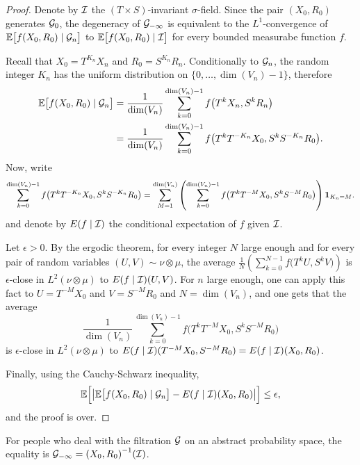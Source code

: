 \documentclass[12pt,a4paper]{article}
\begin{document}
\begin{proof}
Denote by $\mathcal{I}$ the $(T\times S)$-invariant $\sigma$-field. 
Since the pair $(X_0, R_0)$ generates $\mathcal{G}_0$, the degeneracy of $\mathcal{G}_{-\infty}$ 
is equivalent to the $L^1$-convergence of 
$\mathbb{E}\bigl[f(X_0, R_0) \mid \mathcal{G}_n\bigr]$ to $\mathbb{E}\bigl[f(X_0, R_0) \mid \mathcal{I}\bigr]$   
for every bounded measurabe function $f$. 

Recall that $X_{0} = T^{K_n}X_n$ and $R_{0} = S^{K_n}R_n$. 
Conditionally to $\mathcal{G}_n$, the random integer $K_n$ 
has the uniform distribution on $\bigl\{0, \ldots, \dim(V_n)-1\bigr\}$, 
therefore 
\begin{align*}
\mathbb{E}\bigl[f(X_0, R_0) \mid \mathcal{G}_n\bigr]
& =\frac{1}{\dim(V_n)}\sum_{k=0}^{\dim(V_n)-1} f\bigl(T^kX_n, S^kR_n \bigr) \\
& = \frac{1}{\dim(V_n)}\sum_{k=0}^{\dim(V_n)-1} f\bigl(T^{k}T^{-K_n}X_0, S^{k}S^{-K_n}R_0 \bigr).
\end{align*}
Now, write 
$$
\sum_{k=0}^{\dim(V_n)-1} f\bigl(T^{k}T^{-K_n}X_0, S^{k}S^{-K_n}R_0 \bigr) = 
\sum_{M=1}^{\dim(V_n)} \left(\sum_{k=0}^{\dim(V_n)-1} f\bigl(T^kT^{-M}X_0, S^kS^{-M}R_0 \bigr) \right)\boldsymbol 1_{K_n=M}.
$$
and denote by $E(f\mid\mathcal{I})$ the conditional expectation of $f$ given $\mathcal{I}$.

Let $\epsilon>0$. By the ergodic theorem, for every integer $N$ large enough and 
for every pair of random variables $(U,V) \sim \nu \otimes \mu$, the average 
$\frac{1}{N} \left(\sum_{k=0}^{N-1} f\bigl(T^k U, S^kV\bigr) \right)$ 
is $\epsilon$-close in $L^2(\nu \otimes \mu)$ to 
$E(f\mid\mathcal{I})(U,V)$. 
For $n$ large enough, one can apply this fact to $U=T^{-M}X_0$ and $V=S^{-M}R_0$ and 
$N=\dim(V_n)$, and one gets that the average 
$$
\frac{1}{\dim(V_n)}\sum_{k=0}^{\dim(V_n)-1} f\bigl(T^kT^{-M}X_0, S^kS^{-M}R_0 \bigr)
$$
is $\epsilon$-close in $L^2(\nu \otimes \mu)$ to 
$E(f\mid\mathcal{I})(T^{-M}X_0,S^{-M}R_0)=E(f\mid\mathcal{I})(X_0,R_0)$. 

Finally, using the Cauchy-Schwarz inequality,
$$
\mathbb{E}\Bigl[ \left| \mathbb{E}\bigl[f(X_0, R_0) \mid \mathcal{G}_n\bigr] - E(f\mid\mathcal{I})(X_0,R_0) \right| \Bigr] 
\leq \epsilon,
$$
and the proof is over.
\end{proof}

\begin{remark}
For people who deal with the filtration $\mathcal{G}$ on an abstract probability space, 
the equality is $\mathcal{G}_{-\infty} = {(X_0, R_0)}^{-1}(\mathcal{I})$. 
\end{remark}

\end{document}
